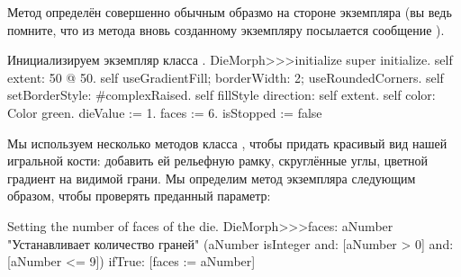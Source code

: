 \documentclass[a4paper,10pt,twoside]{book}
\begin{document}
Метод  определён совершенно обычным образмо на стороне экземпляра (вы ведь помните, что из метода  вновь созданному экземпляру посылается сообщение ).
\begin{method}{Инициализируем экземпляр класса .}
DieMorph>>>initialize
	super initialize.
	self extent: 50 @ 50.
	self useGradientFill; borderWidth: 2; useRoundedCorners.
	self setBorderStyle: #complexRaised.
	self fillStyle direction: self extent.
	self color: Color green.
	dieValue := 1.
	faces := 6.
	isStopped := false
\end{method}

Мы используем несколько методов класса , чтобы придать красивый вид нашей игральной кости: добавить ей рельефную рамку, скруглённые углы, цветной градиент на видимой грани.
Мы определим метод экземпляра  следующим образом, чтобы проверять преданный параметр:
\begin{method}{Setting the number of faces of the die.}
DieMorph>>>faces: aNumber
	"Устанавливает количество граней"
	(aNumber isInteger
			and: [aNumber > 0]
			and: [aNumber <= 9])
		ifTrue: [faces := aNumber]
\end{method}
\end{document}
